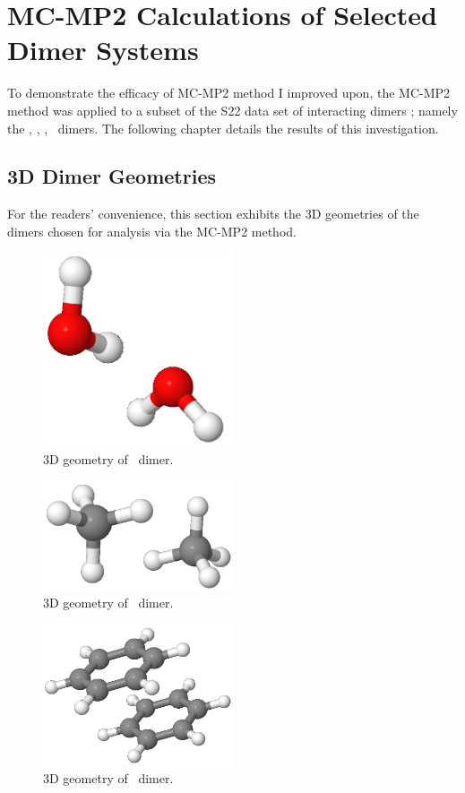 \chapter{MC-MP2 Calculations of Selected Dimer Systems}

To demonstrate the efficacy of MC-MP2 method I improved upon, the MC-MP2 method
was applied to a subset of the S22 data set of interacting dimers \cite{s22};
namely the \hho, \ch, \benzT, \benzpara\ dimers. The following chapter details
the results of this investigation.

\section{3D Dimer Geometries}

For the readers' convenience, this section exhibits the 3D geometries of the
dimers chosen for analysis via the MC-MP2 method.

\begin{figure}
\centering
\includegraphics[width = 0.5\textwidth]{figures/h2o.png}
\caption{3D geometry of \hho\ dimer.}
\end{figure}

\begin{figure}
\centering
\includegraphics[width = 0.5\textwidth]{figures/ch4.png}
\caption{3D geometry of \ch\ dimer.}
\end{figure}

\begin{figure}
\centering
\includegraphics[width = 0.5\textwidth]{figures/benzene-parallel-displaced.png}
\caption{3D geometry of \benzpara\ dimer.}
\end{figure}

